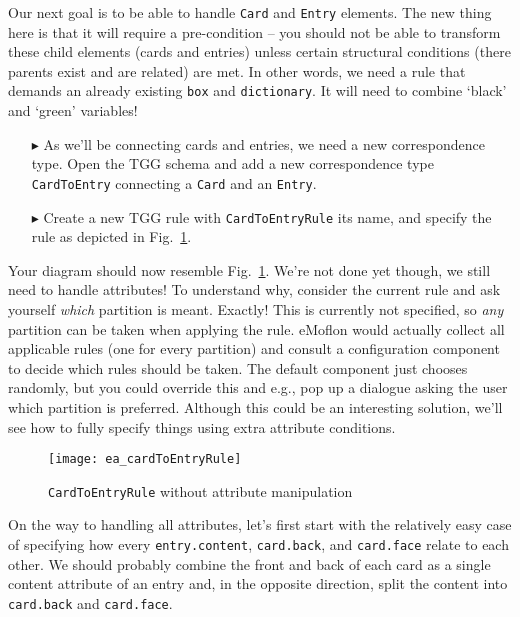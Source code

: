 Our next goal is to be able to handle \texttt{Card} and \texttt{Entry} elements. 
The new thing here is that it will require a pre-condition -- you should not be able to transform these child elements (cards and entries) unless certain structural conditions (there parents exist and are related) are met. 
In other words, we need a rule that demands an already existing \texttt{box} and \texttt{dictionary}. 
It will need to combine `black' and `green' variables! 

\begin{enumerate}

\item[$\blacktriangleright$] As we'll be connecting cards and entries, we need a new correspondence type.
Open the TGG schema and add a new correspondence type \texttt{CardToEntry} connecting a \texttt{Card} and an \texttt{Entry}.

\item[$\blacktriangleright$] Create a new TGG rule with \texttt{Card\-To\-Ent\-ry\-Rule} its name, and specify the rule as depicted in Fig.~\ref{ea:cardtoentry_1}.
\end{enumerate}

Your diagram should now resemble Fig.~\ref{ea:cardtoentry_1}. 
We're not done yet though, we still need to handle attributes!
To understand why, consider the current rule and ask yourself  \emph{which} partition is meant.
Exactly!  This is currently not specified, so \emph{any} partition can be taken when applying the rule.
eMoflon would actually collect all applicable rules (one for every partition) and consult a configuration component to decide which rules should be taken.
The default component just chooses randomly, but you could override this and e.g., pop up a dialogue asking the user which partition is preferred.
Although this could be an interesting solution, we'll see how to fully specify things using extra attribute conditions.

\begin{figure}[htbp]
  \begin{center}
    \texttt{[image: ea\_cardToEntryRule]}
    \caption{\texttt{CardToEntryRule} without attribute manipulation}
    \label{ea:cardtoentry_1}
  \end{center}
\end{figure}

On the way to handling all attributes, let's first start with the relatively easy case of specifying how every \texttt{entry\-.cont\-ent}, \texttt{card.back}, and \texttt{card.face} relate to each other.
We should probably combine the front and back of each card as a single content attribute of an entry and, in the opposite direction, split the content into \texttt{card.back} and \texttt{card.face}.

